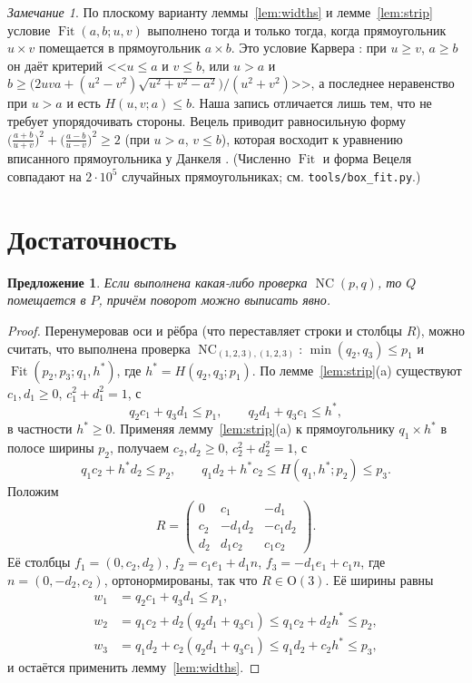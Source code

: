 \documentclass[11pt]{article}
\newtheorem{proposition}[theorem]{Предложение}
\theoremstyle{definition}
\theoremstyle{remark}
\newtheorem{remark}[theorem]{Замечание}
\newcommand{\Ort}{\mathrm{O}(3)}
\newcommand{\Fit}{\operatorname{Fit}}
\newcommand{\NC}{\operatorname{NC}}
\begin{document}
\begin{remark}\label{rem:carver}
По плоскому варианту леммы~\ref{lem:widths} и лемме~\ref{lem:strip} условие $\Fit(a,b;u,v)$
выполнено тогда и только тогда, когда прямоугольник $u\times v$ помещается в прямоугольник
$a\times b$. Это условие Карвера \cite{Carver1957}: при $u\ge v$, $a\ge b$ он даёт критерий
<<$u\le a$ и $v\le b$, или $u>a$ и $b\ge\bigl(2uva+(u^2-v^2)\sqrt{u^2+v^2-a^2}\bigr)/(u^2+v^2)$>>, а
последнее неравенство при $u>a$ и есть $H(u,v;a)\le b$. Наша запись отличается лишь тем, что не
требует упорядочивать стороны. Вецель \cite[теорема~1]{Wetzel2000} приводит равносильную форму
$\bigl(\tfrac{a+b}{u+v}\bigr)^2+\bigl(\tfrac{a-b}{u-v}\bigr)^2\ge 2$ (при $u>a$, $v\le b$), которая
восходит к уравнению вписанного прямоугольника у Данкеля \cite{Dunkel1920}. (Численно $\Fit$ и форма
Вецеля совпадают на $2\cdot10^5$ случайных прямоугольниках; см. \texttt{tools/box\_fit.py}.)
\end{remark}

\section{Достаточность}\label{sec:suff}

\begin{proposition}\label{prop:suff}
Если выполнена какая-либо проверка $\NC(p,q)$, то $Q$ помещается в $P$, причём поворот можно
выписать явно.
\end{proposition}

\begin{proof}
Перенумеровав оси и рёбра (что переставляет строки и столбцы $R$), можно считать, что выполнена
проверка $\NC_{(1,2,3),(1,2,3)}$: $\min(q_2,q_3)\le p_1$ и $\Fit(p_2,p_3;q_1,h^*)$, где
$h^*=H(q_2,q_3;p_1)$. По лемме~\ref{lem:strip}(a) существуют $c_1,d_1\ge0$, $c_1^2+d_1^2=1$, с
\[
q_2c_1+q_3d_1\le p_1,\qquad q_2d_1+q_3c_1\le h^*,
\]
в частности $h^*\ge0$. Применяя лемму~\ref{lem:strip}(a) к прямоугольнику $q_1\times h^*$ в полосе
ширины $p_2$, получаем $c_2,d_2\ge 0$, $c_2^2+d_2^2=1$, с
\[
q_1c_2+h^*d_2\le p_2,\qquad q_1d_2+h^*c_2\le H(q_1,h^*;p_2)\le p_3 .
\]
Положим
\[
R=\begin{pmatrix}0&c_1&-d_1\\ c_2&-d_1d_2&-c_1d_2\\ d_2&d_1c_2&c_1c_2\end{pmatrix}.
\]
Её столбцы $f_1=(0,c_2,d_2)$, $f_2=c_1e_1+d_1n$, $f_3=-d_1e_1+c_1n$, где $n=(0,-d_2,c_2)$,
ортонормированы, так что $R\in\Ort$. Её ширины равны
\begin{align*}
w_1&=q_2c_1+q_3d_1\le p_1,\\
w_2&=q_1c_2+d_2(q_2d_1+q_3c_1)\le q_1c_2+d_2h^*\le p_2,\\
w_3&=q_1d_2+c_2(q_2d_1+q_3c_1)\le q_1d_2+c_2h^*\le p_3,
\end{align*}
и остаётся применить лемму~\ref{lem:widths}.
\end{proof}
\end{document}
